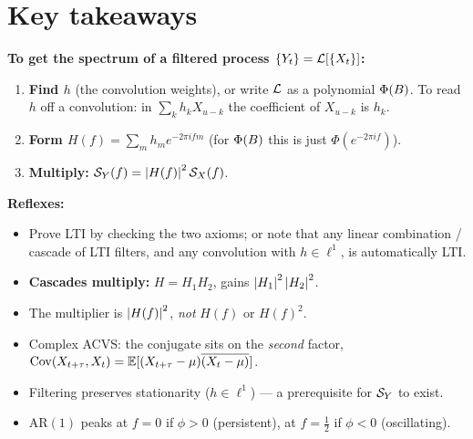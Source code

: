 \documentclass[11pt]{article}
\begin{document}
\section*{Key takeaways}

\begin{retenir}
\textbf{To get the spectrum of a filtered process $\{Y_t\}=\mathcal{L}[\{X_t\}]$:}
\begin{enumerate}
  \item \textbf{Find $h$} (the convolution weights), or write $\mathcal{L}$ as a polynomial $\Phi(B)$. To read $h$ off a convolution: in $\sum_k h_k X_{u-k}$ the coefficient of $X_{u-k}$ is $h_k$.
  \item \textbf{Form $H(f)=\sum_m h_m e^{-2\pi i f m}$} (for $\Phi(B)$ this is just $\Phi(e^{-2\pi i f})$).
  \item \textbf{Multiply:} $\mathcal{S}_Y(f)=\left\lvert H(f) \right\rvert^2\mathcal{S}_X(f)$.
\end{enumerate}
\textbf{Reflexes:}
\begin{itemize}
  \item Prove LTI by checking the two axioms; or note that any linear combination / cascade of LTI filters, and any convolution with $h\in\ell^1$, is automatically LTI.
  \item \textbf{Cascades multiply:} $H=H_1H_2$, gains $\left\lvert H_1 \right\rvert^2\left\lvert H_2 \right\rvert^2$.
  \item The multiplier is $\left\lvert H(f) \right\rvert^2$, \emph{not} $H(f)$ or $H(f)^2$.
  \item Complex ACVS: the conjugate sits on the \emph{second} factor, $\operatorname{Cov}(X_{t+\tau},X_t)=\mathbb{E}[(X_{t+\tau}-\mu)\overline{(X_t-\mu)}]$.
  \item Filtering preserves stationarity ($h\in\ell^1$) --- a prerequisite for $\mathcal{S}_Y$ to exist.
  \item AR$(1)$ peaks at $f=0$ if $\phi>0$ (persistent), at $f=\tfrac12$ if $\phi<0$ (oscillating).
\end{itemize}
\end{retenir}
\end{document}
